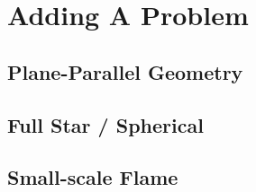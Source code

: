 \section{Adding A Problem}

\subsection{Plane-Parallel Geometry}


\subsection{Full Star / Spherical}


\subsection{Small-scale Flame}




